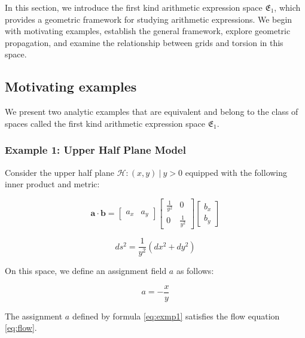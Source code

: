 In this section, we introduce the first kind arithmetic expression space $\mathfrak{E}_1$, which provides a geometric framework for studying arithmetic expressions. We begin with motivating examples, establish the general framework, explore geometric propagation, and examine the relationship between grids and torsion in this space.

\subsection{Motivating examples}\label{subsec:motivexamples}

We present two analytic examples that are equivalent and belong to the class of spaces called the first kind arithmetic expression space $\mathfrak{E}_1$.

\subsubsection{Example 1: Upper Half Plane Model}

Consider the upper half plane ${\mathcal{H}: (x, y) \ | \ y > 0}$ equipped with the following inner product and metric:

$$
\mathbf{a} \cdot \mathbf{b} = \begin{bmatrix} a_x & a_y \end{bmatrix} \begin{bmatrix} \frac{1}{y^2} & 0 \\ 0 & \frac{1}{y^2} \end{bmatrix} \begin{bmatrix} b_x \\ b_y \end{bmatrix}
$$

$$
ds^2 = \frac{1}{y^2} (dx^2 + dy^2)
$$

On this space, we define an assignment field $a$ as follows:

\begin{equation}\label{eq:exmp1}
a = - \frac{x}{y}
\end{equation}

\begin{theorem}\label{thm:exmp1}
The assignment $a$ defined by formula \eqref{eq:exmp1} satisfies the flow equation \eqref{eq:flow}.
\end{theorem}

